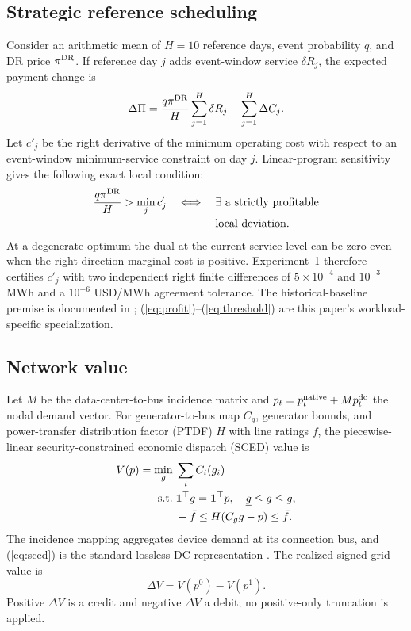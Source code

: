 \documentclass[10pt,journal]{IEEEtran}
\begin{document}
\subsection{Strategic reference scheduling}

Consider an arithmetic mean of $H=10$ reference days, event probability $q$,
and DR price $\pi^{\rm DR}$. If reference day $j$ adds event-window service
$\delta R_j$, the expected payment change is
\begin{equation}
 \Delta\Pi=\frac{q\pi^{\rm DR}}{H}\sum_{j=1}^{H}\delta R_j
 -\sum_{j=1}^{H}\Delta C_j .
 \label{eq:profit}
\end{equation}
Let $c'_j$ be the right derivative of the minimum operating cost with respect
to an event-window minimum-service constraint on day $j$. Linear-program
sensitivity \cite{boyd2004convex} gives the following exact local condition:
\begin{equation}
\begin{aligned}
 \frac{q\pi^{\rm DR}}{H}>\min_j c'_j
 \quad\Longleftrightarrow\quad {}&
 \exists\ \text{a strictly profitable}\\[-2pt]
 &\text{local deviation}.
\end{aligned}
 \label{eq:threshold}
\end{equation}
At a degenerate optimum the dual at the current service level can be zero
even when the right-direction marginal cost is positive. Experiment~1
therefore certifies $c'_j$ with two independent right finite differences of
$5\times10^{-4}$ and $10^{-3}$ MWh and a $10^{-6}$ USD/MWh agreement
tolerance.
The historical-baseline premise is documented in
\cite{wang2022baseline}; (\ref{eq:profit})--(\ref{eq:threshold})
are this paper's workload-specific specialization.

\subsection{Network value}

Let $M$ be the data-center-to-bus incidence matrix and
$p_t=p_t^{\rm native}+Mp_t^{\rm dc}$ the nodal demand vector. For
generator-to-bus map $C_g$, generator bounds, and power-transfer distribution
factor (PTDF) $H$ with line ratings $\bar f$, the
piecewise-linear security-constrained economic dispatch (SCED) value is
\begin{align}
 V(p)=\min_g\;&\sum_i C_i(g_i) \label{eq:sced}\\
 {\rm s.t.}\;&\mathbf1^\top g=\mathbf1^\top p,\quad
 \underline g\leq g\leq\bar g,\nonumber\\
 &-\bar f\leq H(C_gg-p)\leq\bar f.\nonumber
\end{align}
The incidence mapping aggregates device demand at its connection bus, and
(\ref{eq:sced}) is the standard lossless DC representation
\cite{stott2009dc,zimmerman2011matpower}. The realized signed grid value is
\begin{equation}
 \Delta V=V(p^0)-V(p^1). \label{eq:value}
\end{equation}
Positive $\Delta V$ is a credit and negative $\Delta V$ a debit; no
positive-only truncation is applied.
\end{document}
